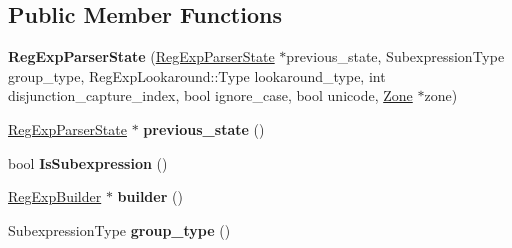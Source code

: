 \subsection*{Public Member Functions}
\begin{DoxyCompactItemize}
\item 
{\bfseries Reg\+Exp\+Parser\+State} (\hyperlink{classv8_1_1internal_1_1_b_a_s_e___e_m_b_e_d_d_e_d_1_1_reg_exp_parser_state}{Reg\+Exp\+Parser\+State} $\ast$previous\+\_\+state, Subexpression\+Type group\+\_\+type, Reg\+Exp\+Lookaround\+::\+Type lookaround\+\_\+type, int disjunction\+\_\+capture\+\_\+index, bool ignore\+\_\+case, bool unicode, \hyperlink{classv8_1_1internal_1_1_zone}{Zone} $\ast$zone)\hypertarget{classv8_1_1internal_1_1_b_a_s_e___e_m_b_e_d_d_e_d_1_1_reg_exp_parser_state_a32fa6fc6d8cab6e3575d24bdd00e92a1}{}\label{classv8_1_1internal_1_1_b_a_s_e___e_m_b_e_d_d_e_d_1_1_reg_exp_parser_state_a32fa6fc6d8cab6e3575d24bdd00e92a1}

\item 
\hyperlink{classv8_1_1internal_1_1_b_a_s_e___e_m_b_e_d_d_e_d_1_1_reg_exp_parser_state}{Reg\+Exp\+Parser\+State} $\ast$ {\bfseries previous\+\_\+state} ()\hypertarget{classv8_1_1internal_1_1_b_a_s_e___e_m_b_e_d_d_e_d_1_1_reg_exp_parser_state_a01656f472a4d98ccfa4e8659a1710e0e}{}\label{classv8_1_1internal_1_1_b_a_s_e___e_m_b_e_d_d_e_d_1_1_reg_exp_parser_state_a01656f472a4d98ccfa4e8659a1710e0e}

\item 
bool {\bfseries Is\+Subexpression} ()\hypertarget{classv8_1_1internal_1_1_b_a_s_e___e_m_b_e_d_d_e_d_1_1_reg_exp_parser_state_a0285ac03268b1c58ab6a5a8022c34526}{}\label{classv8_1_1internal_1_1_b_a_s_e___e_m_b_e_d_d_e_d_1_1_reg_exp_parser_state_a0285ac03268b1c58ab6a5a8022c34526}

\item 
\hyperlink{classv8_1_1internal_1_1_reg_exp_builder}{Reg\+Exp\+Builder} $\ast$ {\bfseries builder} ()\hypertarget{classv8_1_1internal_1_1_b_a_s_e___e_m_b_e_d_d_e_d_1_1_reg_exp_parser_state_a52755365b06cd1c0359cce4671ad3cde}{}\label{classv8_1_1internal_1_1_b_a_s_e___e_m_b_e_d_d_e_d_1_1_reg_exp_parser_state_a52755365b06cd1c0359cce4671ad3cde}

\item 
Subexpression\+Type {\bfseries group\+\_\+type} ()\hypertarget{classv8_1_1internal_1_1_b_a_s_e___e_m_b_e_d_d_e_d_1_1_reg_exp_parser_state_a60ef72fd72afbf25620872134ac57061}{}\label{classv8_1_1internal_1_1_b_a_s_e___e_m_b_e_d_d_e_d_1_1_reg_exp_parser_state_a60ef72fd72afbf25620872134ac57061}


\end{DoxyCompactItemize}
